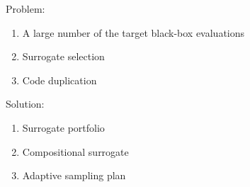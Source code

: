         Problem:
        \begin{enumerate}
            \item A large number of the target black-box evaluations
            \item Surrogate selection
            \item Code duplication
        \end{enumerate}

        Solution:
        \begin{enumerate}
            \item Surrogate portfolio
            \item Compositional surrogate 
            \item Adaptive sampling plan
        \end{enumerate}










